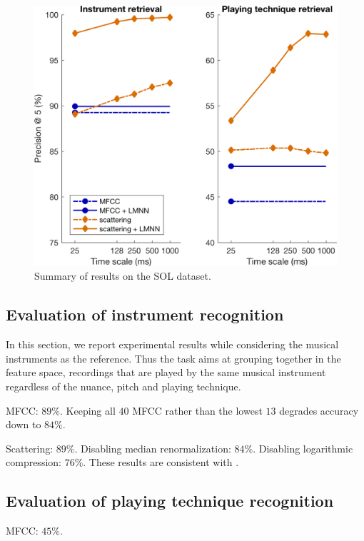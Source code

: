 \documentclass{article}
\begin{document}
\begin{figure}
\includegraphics[width=\linewidth,keepaspectratio]{./figs/results/results.png}
\caption{Summary of results on the SOL dataset.}
\label{fig:dataset-statistics}
\end{figure}

\subsection{Evaluation of instrument recognition}

In this section, we report experimental results while considering the musical instruments as the reference. Thus the task aims at grouping together in the feature space, recordings that are played by the same musical instrument regardless of the nuance, pitch and playing technique.

MFCC: $89\%$.
Keeping all $40$ MFCC rather than the lowest $13$ degrades accuracy down to $84\%$.


Scattering: $89\%$. Disabling median renormalization: $84\%$. Disabling logarithmic compression: $76\%$. These results are consistent with \cite{lostanlen2017phd}.


\subsection{Evaluation of playing technique recognition}

MFCC: $45\%$. 
\end{document}
